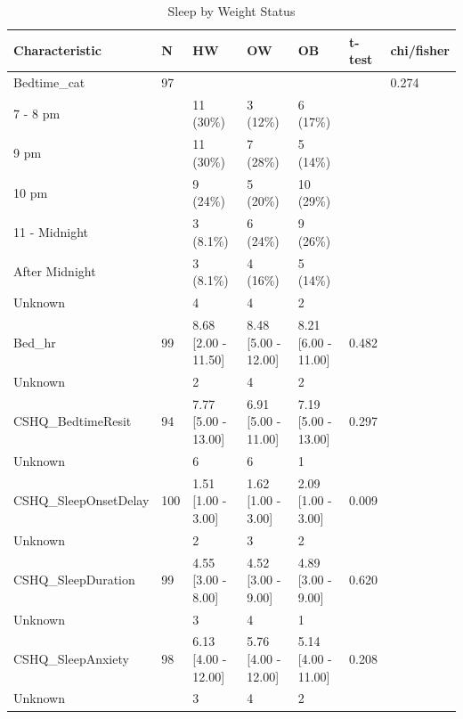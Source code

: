 \documentclass[
]{article}
\begin{document}
\begin{table}[!h]

\caption{\label{tab:Beh_OB_tab}Sleep by Weight Status}
\centering
\begin{tabular}[t]{lllllll}
\toprule
Characteristic & N & HW & OW & OB & t-test & chi/fisher\\
\midrule
Bedtime\_cat & 97 &  &  &  &  & 0.274\\
\hspace{1em}7 - 8 pm &  & 11 (30\%) & 3 (12\%) & 6 (17\%) &  & \\
\hspace{1em}9 pm &  & 11 (30\%) & 7 (28\%) & 5 (14\%) &  & \\
\hspace{1em}10 pm &  & 9 (24\%) & 5 (20\%) & 10 (29\%) &  & \\
\hspace{1em}11 - Midnight &  & 3 (8.1\%) & 6 (24\%) & 9 (26\%) &  & \\
\addlinespace
\hspace{1em}After Midnight &  & 3 (8.1\%) & 4 (16\%) & 5 (14\%) &  & \\
\hspace{1em}Unknown &  & 4 & 4 & 2 &  & \\
Bed\_hr & 99 & 8.68 [2.00 - 11.50] & 8.48 [5.00 - 12.00] & 8.21 [6.00 - 11.00] & 0.482 & \\
\hspace{1em}Unknown &  & 2 & 4 & 2 &  & \\
CSHQ\_BedtimeResit & 94 & 7.77 [5.00 - 13.00] & 6.91 [5.00 - 11.00] & 7.19 [5.00 - 13.00] & 0.297 & \\
\addlinespace
\hspace{1em}Unknown &  & 6 & 6 & 1 &  & \\
CSHQ\_SleepOnsetDelay & 100 & 1.51 [1.00 - 3.00] & 1.62 [1.00 - 3.00] & 2.09 [1.00 - 3.00] & 0.009 & \\
\hspace{1em}Unknown &  & 2 & 3 & 2 &  & \\
CSHQ\_SleepDuration & 99 & 4.55 [3.00 - 8.00] & 4.52 [3.00 - 9.00] & 4.89 [3.00 - 9.00] & 0.620 & \\
\hspace{1em}Unknown &  & 3 & 4 & 1 &  & \\
\addlinespace
CSHQ\_SleepAnxiety & 98 & 6.13 [4.00 - 12.00] & 5.76 [4.00 - 12.00] & 5.14 [4.00 - 11.00] & 0.208 & \\
\hspace{1em}Unknown &  & 3 & 4 & 2 &  & \\

\end{tabular}
\end{table}
\end{document}
